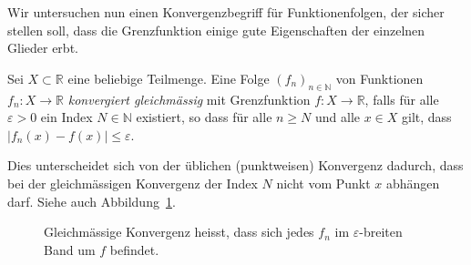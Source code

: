 \documentclass[../main.tex]{subfiles}
\begin{document}
Wir untersuchen nun einen Konvergenzbegriff für Funktionenfolgen,
der sicher stellen soll, dass die Grenzfunktion einige gute Eigenschaften
der einzelnen Glieder erbt.

\begin{definition}
  Sei $X \subset \mathbb{R}$ eine beliebige Teilmenge.
  Eine Folge ${(f_{n})}_{n \in \mathbb{N}}$ von Funktionen $f_n \colon X \to \mathbb{R}$
  \emph{konvergiert gleichmässig} mit Grenzfunktion $f \colon X \to \mathbb{R}$,
  falls für alle $\varepsilon > 0$ ein Index $N \in \mathbb{N}$ existiert,
  so dass für alle $n \geq N$ und alle $x \in X$ gilt, dass
  $|f_n(x) - f(x)| \leq \varepsilon$.
\end{definition}

Dies unterscheidet sich von der üblichen (punktweisen) Konvergenz dadurch,
dass bei der gleichmässigen Konvergenz der Index $N$ nicht vom Punkt $x$ abhängen darf.
Siehe auch Abbildung~\ref{fig:uniform}.

\begin{figure}[htb]
  \centering
  
  \caption{Gleichmässige Konvergenz heisst, dass sich jedes
  $f_n$ im $\varepsilon$-breiten Band um $f$ befindet.}%
  \label{fig:uniform}
\end{figure}
\end{document}
